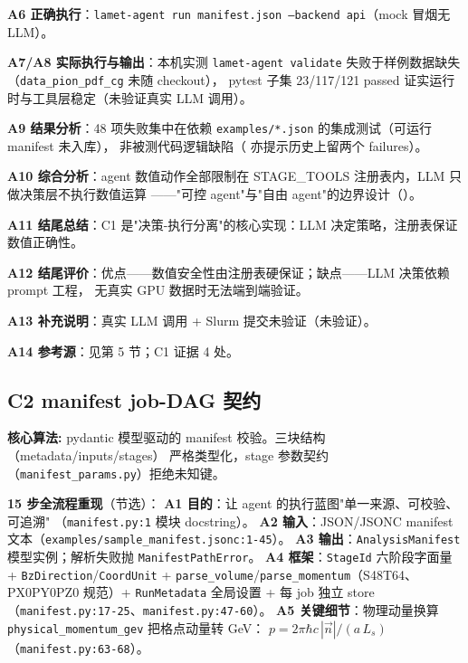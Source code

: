 \documentclass[UTF8]{ctexart}
\begin{document}
\textbf{A6 正确执行}：\texttt{lamet-agent run manifest.json}\allowbreak\texttt{ --backend api}（mock 冒烟无 LLM）。

\textbf{A7/A8 实际执行与输出}：本机实测 \texttt{lamet-agent validate} 失败于样例数据缺失（\texttt{\nolinkurl{data_pion_pdf_cg}} 未随 checkout），
pytest 子集 23/117/121 passed 证实运行时与工具层稳定（\textcolor{warn}{未验证}真实 LLM 调用）。

\textbf{A9 结果分析}：48 项失败集中在依赖 \texttt{examples/*.json} 的集成测试（可运行 manifest 未入库），
非被测代码逻辑缺陷（\texttt{} 亦提示历史上留两个 failures）。

\textbf{A10 综合分析}：agent 数值动作全部限制在 STAGE\_TOOLS 注册表内，LLM 只做决策层不执行数值运算
——"可控 agent"与"自由 agent"的边界设计（\texttt{}）。

\textbf{A11 结尾总结}：C1 是"决策-执行分离"的核心实现：LLM 决定策略，注册表保证数值正确性。

\textbf{A12 结尾评价}：优点——数值安全性由注册表硬保证；缺点——LLM 决策依赖 prompt 工程，
无真实 GPU 数据时无法端到端验证。

\textbf{A13 补充说明}：真实 LLM 调用 + Slurm 提交未验证（\textcolor{warn}{未验证}）。

\textbf{A14 参考源}：见第 5 节；C1 证据 4 处。

\subsection{C2 manifest job-DAG 契约}

\begin{algobox}
\textbf{核心算法:} pydantic 模型驱动的 manifest 校验。三块结构（metadata/inputs/stages）
严格类型化，stage 参数契约（\texttt{manifest\_params.py}）拒绝未知键。
\end{algobox}

\textbf{15 步全流程重现}（节选）：
\textbf{A1 目的}：让 agent 的执行蓝图"单一来源、可校验、可追溯"
（\texttt{\nolinkurl{manifest.py:1}} 模块 docstring）。
\textbf{A2 输入}：JSON/JSONC manifest 文本（\texttt{\nolinkurl{examples/sample_manifest.jsonc:1-45}}）。
\textbf{A3 输出}：\texttt{AnalysisManifest} 模型实例；解析失败抛 \texttt{\nolinkurl{ManifestPathError}}。
\textbf{A4 框架}：\texttt{StageId} 六阶段字面量 + \texttt{\nolinkurl{BzDirection}}/\texttt{\nolinkurl{CoordUnit}} +
\texttt{\nolinkurl{parse_volume}}/\texttt{\nolinkurl{parse_momentum}}（S48T64、PX0PY0PZ0 规范）+ \texttt{RunMetadata}
全局设置 + 每 job 独立 store（\texttt{\nolinkurl{manifest.py:17-25}}、\texttt{\nolinkurl{manifest.py:47-60}}）。
\textbf{A5 关键细节}：物理动量换算 \texttt{\nolinkurl{physical_momentum_gev}} 把格点动量转 GeV：
$p = 2\pi\hbar c\,|\vec n|/(a\,L_s)$（\texttt{\nolinkurl{manifest.py:63-68}}）。
\end{document}
